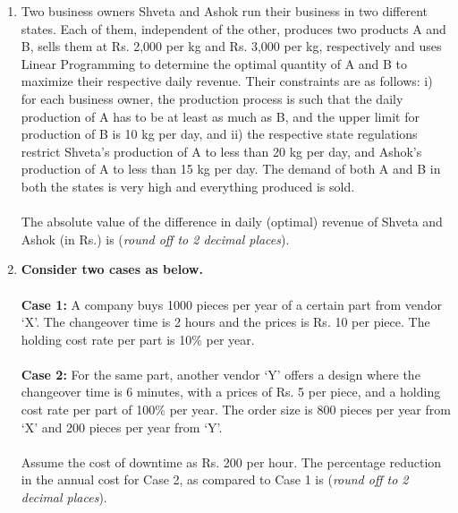 \documentclass[12pt,onecolumn]{article}
\begin{document}
\begin{enumerate}
    \item Two business owners Shveta and Ashok run their business in two different states. Each of them, independent of the other, produces two products A and B, sells them at Rs. 2,000 per kg and Rs. 3,000 per kg, respectively and uses Linear Programming to determine the optimal quantity of A and B to maximize their respective daily revenue. Their constraints are as follows: i) for each business owner, the production process is such that the daily production of A has to be at least as much as B, and the upper limit for production of B is 10 kg per day, and ii) the respective state regulations restrict Shveta's production of A to less than 20 kg per day, and Ashok's production of A to less than 15 kg per day. The demand of both A and B in both the states is very high and everything produced is sold.\\\\
          The absolute value of the difference in daily (optimal) revenue of Shveta and Ashok (in Rs.) is \underline{\hspace{2cm}} (\textit{round off to 2 decimal places}).

    \item \textbf{Consider two cases as below.}\\\\
          \textbf{Case 1:} A company buys 1000 pieces per year of a certain part from vendor `X'. The changeover time is 2 hours and the prices is Rs. 10 per piece. The holding cost rate per part is 10\% per year.\\\\
          \textbf{Case 2:} For the same part, another vendor `Y' offers a design where the changeover time is 6 minutes, with a prices of Rs. 5 per piece, and a holding cost rate per part of 100\% per year. The order size is 800 pieces per year from `X' and 200 pieces per year from `Y'.\\\\
          Assume the cost of downtime as Rs. 200 per hour. The percentage reduction in the annual cost for Case 2, as compared to Case 1 is \underline{\hspace{2cm}} (\textit{round off to 2 decimal places}).


\end{enumerate}
\end{document}
